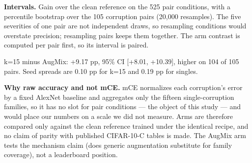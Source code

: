 \noindent{}
\textbf{Intervals.} Gain over the clean reference on the 525 pair conditions, with a percentile bootstrap over the 105 corruption pairs (20,000 resamples). The five severities of one pair are not independent draws, so resampling conditions would overstate precision; resampling pairs keeps them together. The arm contrast is computed per pair first, so its interval is paired.

\noindent{}
k=15 minus AugMix: +9.17 pp, 95\% CI [+8.01, +10.39], higher on 104 of 105 pairs. Seed spreads are 0.10 pp for k=15 and 0.19 pp for singles.

\textbf{Why raw accuracy and not mCE.} mCE normalizes each corruption's error by a fixed AlexNet baseline and aggregates only the fifteen single-corruption families, so it has no slot for pair conditions --- the object of this study --- and would place our numbers on a scale we did not measure. Arms are therefore compared only against the clean reference trained under the identical recipe, and no claim of parity with published CIFAR-10-C tables is made. The AugMix arm tests the mechanism claim (does generic augmentation substitute for family coverage), not a leaderboard position.

